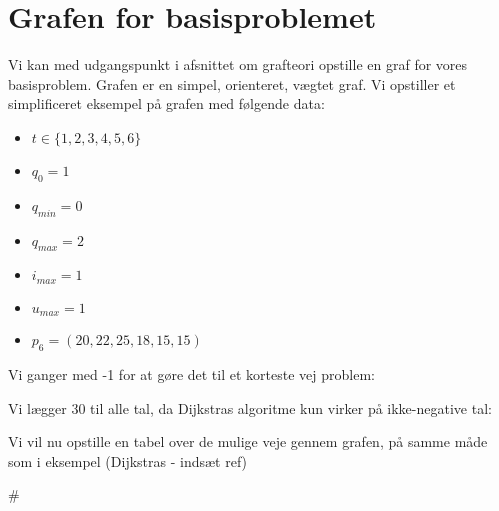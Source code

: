 \section{Grafen for basisproblemet}
Vi kan med udgangspunkt i afsnittet om grafteori opstille en graf for vores basisproblem. Grafen er en simpel, orienteret, vægtet graf. Vi opstiller et simplificeret eksempel på grafen med følgende data:
\begin{itemize}
  \item $t \in \{1,2,3,4,5,6\}$
  \item $q_{0}=1$
  \item $q_{min}=0$
  \item $q_{max}=2$
  \item $i_{max}=1$
  \item $u_{max}=1$
  \item $p_{6}=(20,22,25,18,15,15)$
\end{itemize}



Vi ganger med -1 for at gøre det til et korteste vej problem:



Vi lægger 30 til alle tal, da Dijkstras algoritme kun virker på ikke-negative tal:




Vi vil nu opstille en tabel over de mulige veje gennem grafen, på samme måde som i eksempel (Dijkstras - indsæt ref)

#


